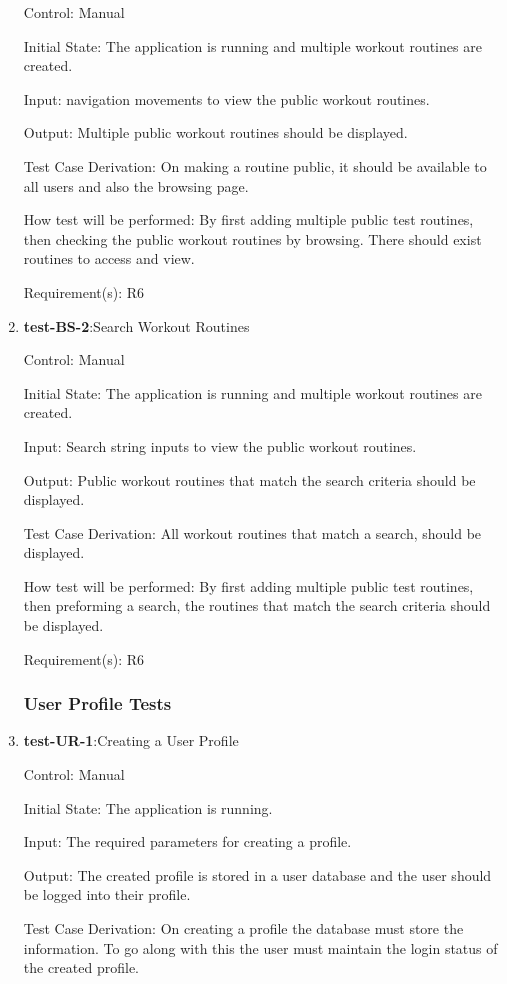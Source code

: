 \documentclass[12pt, titlepage]{article}
\begin{document}
\begin{enumerate}
		Control: Manual
		
		Initial State: The application is running and multiple workout routines are created.
		
		Input: navigation movements to view the public workout routines.
		
		Output: Multiple public workout routines should be displayed. 
		
		Test Case Derivation: On making a routine public, it should be available to all users and also the browsing page.
		
		How test will be performed: By first adding multiple public test routines, then checking the public workout routines by browsing. There should exist routines to access and view.
		
		Requirement(s): R6
		
		\item{\textbf{test-BS-2}}:Search Workout Routines
		
		Control: Manual
		
		Initial State: The application is running and multiple workout routines are created.
		
		Input: Search string inputs to view the public workout routines.
		
		Output: Public workout routines that match the search criteria should be displayed. 
		
		Test Case Derivation: All workout routines that match a search, should be displayed.
		
		How test will be performed: By first adding multiple public test routines, then preforming a search, the routines that match the search criteria should be displayed.
		
		Requirement(s): R6
		
		\subsubsection{User Profile Tests}
		\item{\textbf{test-UR-1}}:Creating a User Profile
		
		Control: Manual
		
		Initial State: The application is running.
		
		Input: The required parameters for creating a profile.
		
		Output: The created profile is stored in a user database and the user should be logged into their profile.
		
		Test Case Derivation: On creating a profile the database must store the information. To go along with this the user must maintain the login status of the created profile.
		

\end{enumerate}
\end{document}
